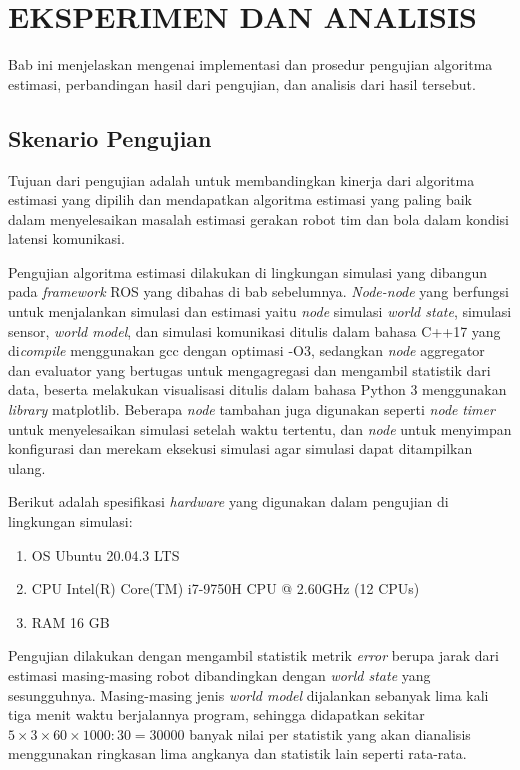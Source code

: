 \chapter{EKSPERIMEN DAN ANALISIS}

Bab ini menjelaskan mengenai implementasi dan prosedur pengujian algoritma estimasi, perbandingan hasil dari pengujian, dan analisis dari hasil tersebut.

\section{Skenario Pengujian}

Tujuan dari pengujian adalah untuk membandingkan kinerja dari algoritma estimasi yang dipilih dan mendapatkan algoritma estimasi yang paling baik dalam menyelesaikan masalah estimasi gerakan robot tim dan bola dalam kondisi latensi komunikasi.

Pengujian algoritma estimasi dilakukan di lingkungan simulasi yang dibangun pada \textit{framework} ROS yang dibahas di bab sebelumnya. \textit{Node-node} yang berfungsi untuk menjalankan simulasi dan estimasi yaitu \textit{node} simulasi \textit{world state}, simulasi sensor, \textit{world model}, dan simulasi komunikasi ditulis dalam bahasa C++17 yang di\textit{compile} menggunakan gcc dengan optimasi -O3, sedangkan \textit{node} aggregator dan evaluator yang bertugas untuk mengagregasi dan mengambil statistik dari data, beserta melakukan visualisasi ditulis dalam bahasa Python 3 menggunakan \textit{library} matplotlib. Beberapa \textit{node} tambahan juga digunakan seperti \textit{node} \textit{timer} untuk menyelesaikan simulasi setelah waktu tertentu, dan \textit{node} untuk menyimpan konfigurasi dan merekam eksekusi simulasi agar simulasi dapat ditampilkan ulang.

Berikut adalah spesifikasi \textit{hardware} yang digunakan dalam pengujian di lingkungan simulasi:
\begin{enumerate}
    \item OS Ubuntu 20.04.3 LTS
    \item CPU Intel(R) Core(TM) i7-9750H CPU @ 2.60GHz (12 CPUs)
    \item RAM 16 GB
\end{enumerate}

Pengujian dilakukan dengan mengambil statistik metrik \textit{error} berupa jarak dari estimasi masing-masing robot dibandingkan dengan \textit{world state} yang sesungguhnya. Masing-masing jenis \textit{world model} dijalankan sebanyak lima kali tiga menit waktu berjalannya program, sehingga didapatkan sekitar $5 \times 3 \times 60 \times 1000 : 30 = 30000$ banyak nilai per statistik yang akan dianalisis menggunakan ringkasan lima angkanya dan statistik lain seperti rata-rata.

